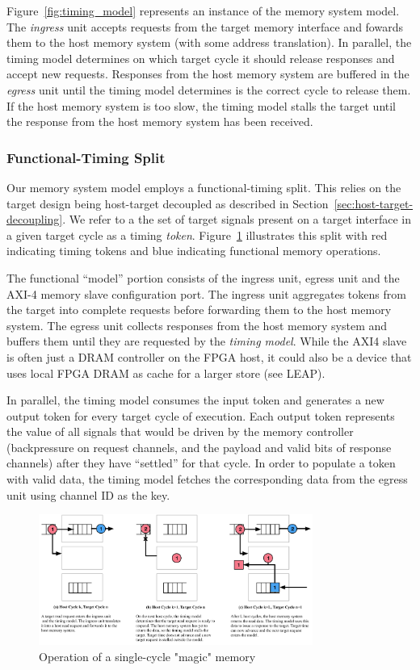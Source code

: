 Figure~\ref{fig:timing_model} represents an instance of the memory system
model. The \textit{ingress} unit accepts requests from the target memory
interface and fowards them to the host memory system (with some address translation).
In parallel, the timing model determines on which target cycle it should
release responses and accept new requests. Responses from the host memory
system are buffered in the \textit{egress} unit until the timing model
determines is the correct cycle to release them. If the host memory system is
too slow, the timing model stalls the target until the response from the host
memory system has been received.

\subsubsection{Functional-Timing Split}

Our memory system model employs a functional-timing split. This relies on the
target design being host-target decoupled as described in
Section~\ref{sec:host-target-decoupling}. We refer to a the set of target
signals present on a target interface in a given target cycle as a timing
\textit{token}. Figure~\ref{fig:model_operation} illustrates this split with
red indicating timing tokens and blue indicating functional memory operations.

The functional ``model'' portion consists of the ingress unit, egress unit and
the AXI-4 memory slave configuration port. The ingress unit aggregates tokens
from the target into complete requests before forwarding them to the host
memory system. The egress unit collects responses from the host memory system
and buffers them until they are requested by the \textit{timing model}. While
the AXI4 slave is often just a DRAM controller on the FPGA host, it could also be a
device that uses local FPGA DRAM as cache for a larger store (see
LEAP\cite{leapscratchpad}).

In parallel, the timing model consumes the input token and generates a new
output token for every target cycle of execution. Each output token represents
the value of all signals that would be driven by the memory controller
(backpressure on request channels, and the payload and valid bits of response
channels) after they have ``settled'' for that cycle. In order to populate a
token with valid data, the timing model fetches the corresponding data from the
egress unit using channel ID as the key.

\begin{figure}
	\centering
	\includegraphics[width=0.8\textwidth]{figures/memory-model-operation.pdf}
	\caption{Operation of a single-cycle "magic" memory}
	\label{fig:model_operation}
\end{figure}

